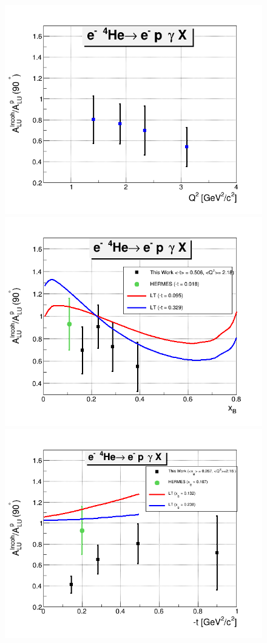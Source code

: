 \begin{figure}[tp]
\centering
\includegraphics[scale=0.38]{fig_ch5/incoh_emc_Q2.png}\\
\includegraphics[scale=0.38]{fig_ch5/incoh_emc_xB.png}\\
\includegraphics[scale=0.38]{fig_ch5/incoh_emc_t.png}

\end{figure}
